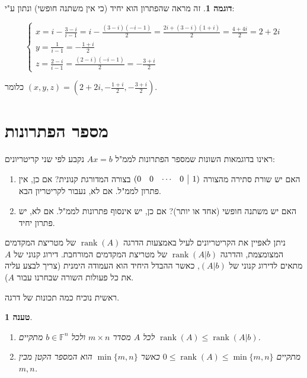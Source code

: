 \documentclass[12pt]{report}
\theoremstyle{plain}
\newtheorem{proposition}[theorem]{טענה}
\theoremstyle{definition}
\newtheorem{example}{דוגמה}[chapter]
\newcommand{\F}{\mathbb{F}}
\DeclareMathOperator{\rank}{rank}
\newcommand{\0}{\mathbf{0}}
\begin{document}
\begin{example}
זה מראה שהפתרון הוא יחיד (כי אין משתנה חופשי) ונתון ע"י:

$$
\begin{cases}
x=i-\frac{3-i}{i-1}=i-\frac{(3-i)(-i-1)}{2}=\frac{2i+(3-i)(1+i)}{2}=\frac{4+4i}{2}=2+2i\\
y=\frac{1}{i-1}=-\frac{1+i}{2} \\
z=\frac{2-i}{i-1}=\frac{(2-i)(-i-1)}{2}=-\frac{3+i}{2}
\end{cases}
$$

כלומר 
$(x,y,z)=(2+2i,-\frac{1+i}{2},-\frac{3+i}{2})$.

\end{example}

\section{מספר הפתרונות}

ראינו בדוגמאות השונות שמספר הפתרונות לממ"ל
$Ax=b$
נקבע לפי שני קריטריונים:

\begin{enumerate}
\item האם יש שורת סתירה מהצורה
$
(\begin{array}{@{}rrrr|r@{}}
0 & 0 & \cdots & 0 & 1 \\
\end{array})
$
בצורה המדורגת קנונית? אם כן, אין פתרון לממ"ל. אם לא, נעבור לקריטריון הבא.

\item האם יש משתנה חופשי (אחד או יותר)? אם כן, יש אינסוף פתרונות לממ"ל. אם לא, יש פתרון יחיד.
\end{enumerate}

ניתן לאפיין את הקריטריונים לעיל באמצעות הדרגה 
$\rank(A)$
של מטריצת המקדמים המצומצמת, והדרגה
$\rank(A|b)$
של מטריצת המקדמים המורחבת. דירוג קנוני של 
$A$
מתאים לדירוג קנוני של
$(A|b)$,
כאשר ההבדל היחיד הוא העמודה הימנית (צריך לבצע עליה את כל פעולות השורה שבחרנו עבור 
$A$).

ראשית נוכיח כמה תכונות של דרגה.

\begin{proposition}\label{prop:rank-inequalities}
\begin{enumerate}[label=\alph*.]
\item
לכל
$A$
מסדר
$m\times n$
ולכל
$b\in\F^n$
מתקיים
$\rank(A)\leq\rank(A|b)$.


\item 
מתקיים
$0\leq\rank(A)\leq\min\{m,n\}$
כאשר
$\min\{m,n\}$
הוא המספר הקטן מבין 
$m,n$.


\end{enumerate}
\end{proposition}
\end{document}
